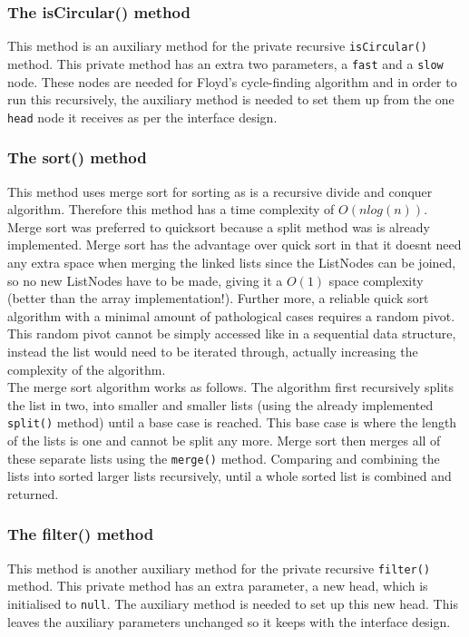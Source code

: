 \documentclass{article}
\begin{document}
\subsubsection{The isCircular() method}
This method is an auxiliary method for the private recursive \verb+isCircular()+ method. This private method has an extra two parameters, a \verb+fast+ and a \verb+slow+ node. These nodes are needed for Floyd's cycle-finding algorithm and in order to run this recursively, the auxiliary method is needed to set them up from the one \verb+head+ node it receives as per the interface design.

\subsubsection{The sort() method}
This method uses merge sort for sorting as is a recursive divide and conquer algorithm. Therefore this method has a time complexity of $O(nlog(n))$. Merge sort was preferred to quicksort because a split method was is already implemented. Merge sort has the advantage over quick sort in that it doesnt need any extra space when merging the linked lists since the ListNodes can be joined, so no new ListNodes have to be made, giving it a $O(1)$ space complexity (better than the array implementation!). Further more, a reliable quick sort algorithm with a minimal amount of pathological cases requires a random pivot. This random pivot cannot be simply accessed like in a sequential data structure, instead the list would need to be iterated through, actually increasing the complexity of the algorithm. \\

\noindent The merge sort algorithm works as follows. The algorithm first recursively splits the list in two, into smaller and smaller lists (using the already implemented \verb+split()+ method) until a base case is reached. This base case is where the length of the lists is one and cannot be split any more. Merge sort then merges all of these separate lists using the \verb+merge()+ method. Comparing and combining the lists into sorted larger lists recursively, until a whole sorted list is combined and returned.

\subsubsection{The filter() method}
This method is another auxiliary method for the private recursive \verb+filter()+ method. This private method has an extra parameter, a new head, which is initialised to \verb+null+. The auxiliary method is needed to set up this new head. This leaves the auxiliary parameters unchanged so it keeps with the interface design.
\end{document}
